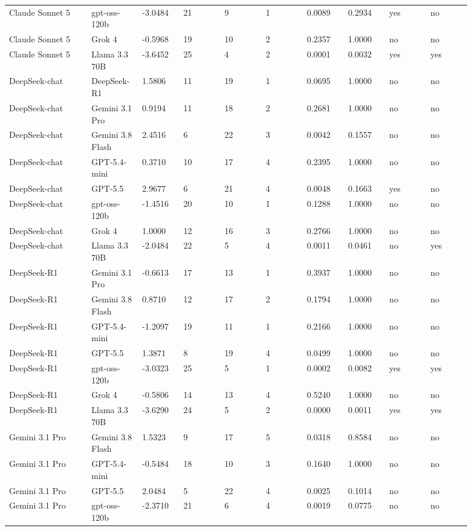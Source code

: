 \begin{landscape}
\begin{longtable}{p{0.162\linewidth}p{0.081\linewidth}p{0.081\linewidth}p{0.081\linewidth}p{0.081\linewidth}p{0.081\linewidth}p{0.081\linewidth}p{0.081\linewidth}p{0.081\linewidth}p{0.081\linewidth}}
Claude Sonnet 5 & gpt-oss-120b & -3.0484 & 21 & 9 & 1 & 0.0089 & 0.2934 & yes & no \\
Claude Sonnet 5 & Grok 4 & -0.5968 & 19 & 10 & 2 & 0.2357 & 1.0000 & no & no \\
Claude Sonnet 5 & Llama 3.3 70B & -3.6452 & 25 & 4 & 2 & 0.0001 & 0.0032 & yes & yes \\
DeepSeek-chat & DeepSeek-R1 & 1.5806 & 11 & 19 & 1 & 0.0695 & 1.0000 & no & no \\
DeepSeek-chat & Gemini 3.1 Pro & 0.9194 & 11 & 18 & 2 & 0.2681 & 1.0000 & no & no \\
DeepSeek-chat & Gemini 3.8 Flash & 2.4516 & 6 & 22 & 3 & 0.0042 & 0.1557 & no & no \\
DeepSeek-chat & GPT-5.4-mini & 0.3710 & 10 & 17 & 4 & 0.2395 & 1.0000 & no & no \\
DeepSeek-chat & GPT-5.5 & 2.9677 & 6 & 21 & 4 & 0.0048 & 0.1663 & yes & no \\
DeepSeek-chat & gpt-oss-120b & -1.4516 & 20 & 10 & 1 & 0.1288 & 1.0000 & no & no \\
DeepSeek-chat & Grok 4 & 1.0000 & 12 & 16 & 3 & 0.2766 & 1.0000 & no & no \\
DeepSeek-chat & Llama 3.3 70B & -2.0484 & 22 & 5 & 4 & 0.0011 & 0.0461 & no & yes \\
DeepSeek-R1 & Gemini 3.1 Pro & -0.6613 & 17 & 13 & 1 & 0.3937 & 1.0000 & no & no \\
DeepSeek-R1 & Gemini 3.8 Flash & 0.8710 & 12 & 17 & 2 & 0.1794 & 1.0000 & no & no \\
DeepSeek-R1 & GPT-5.4-mini & -1.2097 & 19 & 11 & 1 & 0.2166 & 1.0000 & no & no \\
DeepSeek-R1 & GPT-5.5 & 1.3871 & 8 & 19 & 4 & 0.0499 & 1.0000 & no & no \\
DeepSeek-R1 & gpt-oss-120b & -3.0323 & 25 & 5 & 1 & 0.0002 & 0.0082 & yes & yes \\
DeepSeek-R1 & Grok 4 & -0.5806 & 14 & 13 & 4 & 0.5240 & 1.0000 & no & no \\
DeepSeek-R1 & Llama 3.3 70B & -3.6290 & 24 & 5 & 2 & 0.0000 & 0.0011 & yes & yes \\
Gemini 3.1 Pro & Gemini 3.8 Flash & 1.5323 & 9 & 17 & 5 & 0.0318 & 0.8584 & no & no \\
Gemini 3.1 Pro & GPT-5.4-mini & -0.5484 & 18 & 10 & 3 & 0.1640 & 1.0000 & no & no \\
Gemini 3.1 Pro & GPT-5.5 & 2.0484 & 5 & 22 & 4 & 0.0025 & 0.1014 & no & no \\
Gemini 3.1 Pro & gpt-oss-120b & -2.3710 & 21 & 6 & 4 & 0.0019 & 0.0775 & no & no \\

\end{longtable}
\end{landscape}
